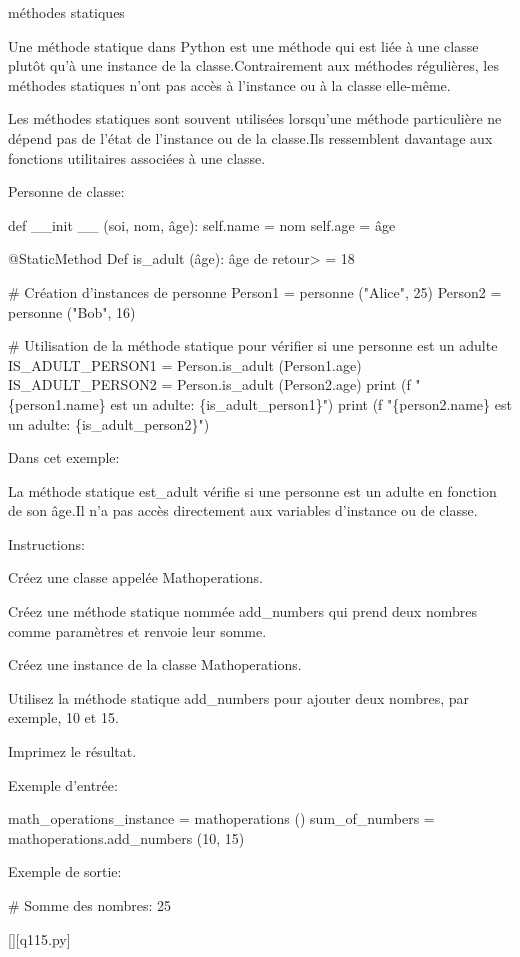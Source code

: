         \question
        méthodes statiques

Une méthode statique dans Python est une méthode qui est liée à une classe plutôt qu'à une instance de la classe.Contrairement aux méthodes régulières, les méthodes statiques n'ont pas accès à l'instance ou à la classe elle-même.

Les méthodes statiques sont souvent utilisées lorsqu'une méthode particulière ne dépend pas de l'état de l'instance ou de la classe.Ils ressemblent davantage aux fonctions utilitaires associées à une classe.

Personne de classe:

def \_\_init \_\_ (soi, nom, âge):
self.name = nom
self.age = âge

@StaticMethod
Def is\_adult (âge):
âge de retour> = 18

\# Création d'instances de personne
Person1 = personne ("Alice", 25)
Person2 = personne ("Bob", 16)

\# Utilisation de la méthode statique pour vérifier si une personne est un adulte
IS\_ADULT\_PERSON1 = Person.is\_adult (Person1.age)
IS\_ADULT\_PERSON2 = Person.is\_adult (Person2.age)
print (f "\{person1.name\} est un adulte: \{is\_adult\_person1\}")
print (f "\{person2.name\} est un adulte: \{is\_adult\_person2\}")

Dans cet exemple:

La méthode statique est\_adult vérifie si une personne est un adulte en fonction de son âge.Il n'a pas accès directement aux variables d'instance ou de classe.

Instructions:

Créez une classe appelée Mathoperations.

Créez une méthode statique nommée add\_numbers qui prend deux nombres comme paramètres et renvoie leur somme.

Créez une instance de la classe Mathoperations.

Utilisez la méthode statique add\_numbers pour ajouter deux nombres, par exemple, 10 et 15.

Imprimez le résultat.

Exemple d'entrée:

math\_operations\_instance = mathoperations ()
sum\_of\_numbers = mathoperations.add\_numbers (10, 15)

Exemple de sortie:

\# Somme des nombres: 25
        \par
        \renewcommand{\nomfichier}{q115.py}
        \begin{solution}
            \pythonfile{\chemincode \nomfichier}[][\nomfichier]
        \end{solution}
        

